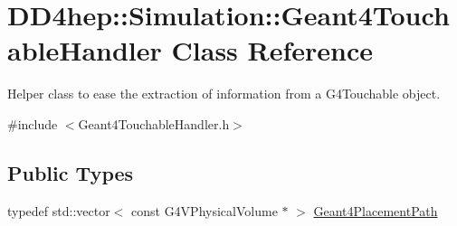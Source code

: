 \hypertarget{class_d_d4hep_1_1_simulation_1_1_geant4_touchable_handler}{}\section{D\+D4hep\+:\+:Simulation\+:\+:Geant4\+Touchable\+Handler Class Reference}
\label{class_d_d4hep_1_1_simulation_1_1_geant4_touchable_handler}


Helper class to ease the extraction of information from a G4\+Touchable object.  




{\ttfamily \#include $<$Geant4\+Touchable\+Handler.\+h$>$}

\subsection*{Public Types}
\begin{DoxyCompactItemize}
\item 
typedef std\+::vector$<$ const G4\+V\+Physical\+Volume $\ast$ $>$ \hyperlink{class_d_d4hep_1_1_simulation_1_1_geant4_touchable_handler_a3ba887af055edecb3e6cfb04f2c7dc2c}{Geant4\+Placement\+Path}
\end{DoxyCompactItemize}
